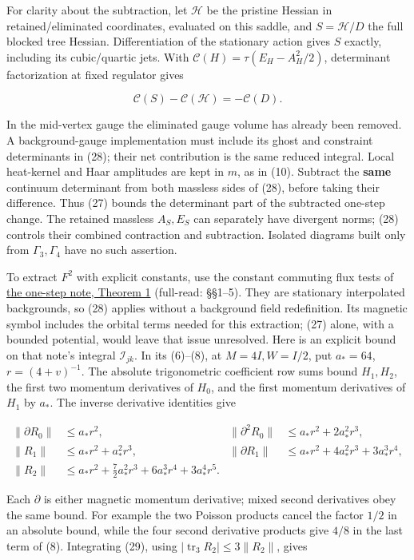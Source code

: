 \documentclass[11pt,a4paper]{article}
\begin{document}
For clarity about the subtraction, let \(\mathcal H\) be the pristine
Hessian in retained/eliminated coordinates, evaluated on this saddle,
and \(S=\mathcal H/D\) the full blocked tree Hessian. Differentiation of
the stationary action gives \(S\) exactly, including its cubic/quartic
jets. With \(\mathcal C(H)=\tau(E_H-A_H^2/2)\), determinant
factorization at fixed regulator gives

\[\mathcal C(S)-\mathcal C(\mathcal H)=-\mathcal C(D). \tag{28}\]

In the mid-vertex gauge the eliminated gauge volume has already been
removed. A background-gauge implementation must include its ghost and
constraint determinants in (28); their net contribution is the same
reduced integral. Local heat-kernel and Haar amplitudes are kept in
\(m\), as in (10). Subtract the \textbf{same} continuum determinant from
both massless sides of (28), before taking their difference. Thus (27)
bounds the determinant part of the subtracted one-step change. The
retained massless \(A_S,E_S\) can separately have divergent norms; (28)
controls their combined contraction and subtraction. Isolated diagrams
built only from \(\Gamma_3,\Gamma_4\) have no such assertion.

To extract \(F^2\) with explicit constants, use the constant commuting
flux tests of \href{four-dimensional-parallel-log.md}{the one-step note,
Theorem 1} (full-read: §§1--5). They are stationary interpolated
backgrounds, so (28) applies without a background field redefinition.
Its magnetic symbol includes the orbital terms needed for this
extraction; (27) alone, with a bounded potential, would leave that issue
unresolved. Here is an explicit bound on that note's integral
\(\mathcal I_{jk}\). In its (6)--(8), at \(M=4I,W=I/2\), put \(a_*=64\),
\(r=(4+v)^{-1}\). The absolute trigonometric coefficient row sums bound
\(H_1,H_2\), the first two momentum derivatives of \(H_0\), and the
first momentum derivatives of \(H_1\) by \(a_*\). The inverse derivative
identities give

\[\begin{aligned}
 \|\partial R_0\|&\le a_*r^2,&
 \|\partial^2R_0\|&\le a_*r^2+2a_*^2r^3,\\
 \|R_1\|&\le a_*r^2+a_*^2r^3,&
 \|\partial R_1\|&\le a_*r^2+4a_*^2r^3+3a_*^3r^4,\\
 \|R_2\|&\le a_*r^2+\tfrac72a_*^2r^3+6a_*^3r^4+3a_*^4r^5.
\end{aligned} \tag{29}\]

Each \(\partial\) is either magnetic momentum derivative; mixed second
derivatives obey the same bound. For example the two Poisson products
cancel the factor \(1/2\) in an absolute bound, while the four second
derivative products give \(4/8\) in the last term of (8). Integrating
(29), using \(|\operatorname{tr}_3R_2|\le3\|R_2\|\), gives
\end{document}
